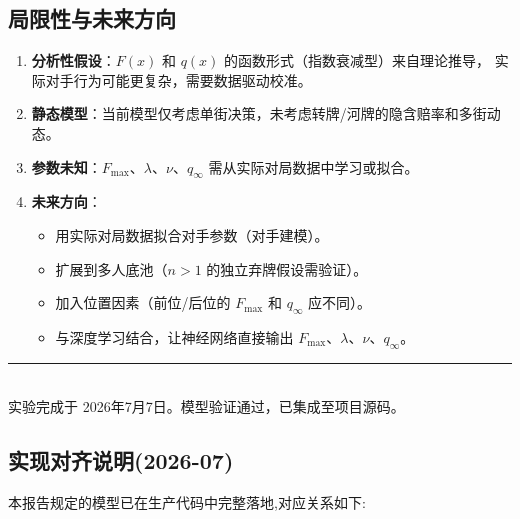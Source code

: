 \documentclass[12pt,a4paper]{ctexart}
\begin{document}
\subsection{局限性与未来方向}

\begin{enumerate}[label=(\arabic*)]
    \item \textbf{分析性假设}：$F(x)$ 和 $q(x)$ 的函数形式（指数衰减型）来自理论推导，
          实际对手行为可能更复杂，需要数据驱动校准。
    \item \textbf{静态模型}：当前模型仅考虑单街决策，未考虑转牌/河牌的隐含赔率和多街动态。
    \item \textbf{参数未知}：$F_{\max}$、$\lambda$、$\nu$、$q_{\infty}$ 需从实际对局数据中学习或拟合。
    \item \textbf{未来方向}：
    \begin{itemize}
        \item 用实际对局数据拟合对手参数（对手建模）。
        \item 扩展到多人底池（$n>1$ 的独立弃牌假设需验证）。
        \item 加入位置因素（前位/后位的 $F_{\max}$ 和 $q_{\infty}$ 应不同）。
        \item 与深度学习结合，让神经网络直接输出 $F_{\max}$、$\lambda$、$\nu$、$q_{\infty}$。
    \end{itemize}
\end{enumerate}

\vspace{1cm}
\begin{center}
\rule{0.3\textwidth}{0.4pt}\\[4pt]
{\small 实验完成于 2026年7月7日。模型验证通过，已集成至项目源码。}
\end{center}


\subsection{实现对齐说明(2026-07)}

本报告规定的模型已在生产代码中完整落地,对应关系如下:
\end{document}

